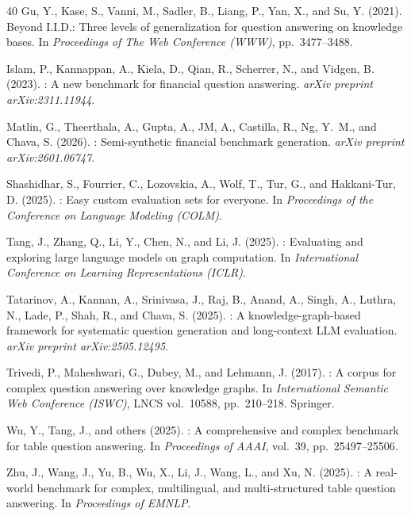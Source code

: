 \documentclass[11pt]{article}
\begin{document}
\begin{thebibliography}{40}
Gu, Y., Kase, S., Vanni, M., Sadler, B., Liang, P., Yan, X., and
  Su, Y. (2021).
\newblock Beyond {I.I.D.}: Three levels of generalization for question
  answering on knowledge bases.
\newblock In \emph{Proceedings of The Web Conference (WWW)}, pp.~3477--3488.

Islam, P., Kannappan, A., Kiela, D., Qian, R., Scherrer, N., and
  Vidgen, B. (2023).
: A new benchmark for financial question answering.
\newblock \emph{arXiv preprint arXiv:2311.11944}.

Matlin, G., Theerthala, A., Gupta, A., JM, A., Castilla, R., Ng, Y.~M.,
  and Chava, S. (2026).
: Semi-synthetic financial benchmark generation.
\newblock \emph{arXiv preprint arXiv:2601.06747}.

Shashidhar, S., Fourrier, C., Lozovskia, A., Wolf, T., Tur, G., and
  Hakkani-Tur, D. (2025).
: Easy custom evaluation sets for everyone.
\newblock In \emph{Proceedings of the Conference on Language Modeling (COLM)}.

Tang, J., Zhang, Q., Li, Y., Chen, N., and Li, J. (2025).
: Evaluating and exploring large language models on graph
  computation.
\newblock In \emph{International Conference on Learning Representations (ICLR)}.

Tatarinov, A., Kannan, A., Srinivasa, J., Raj, B., Anand, A., Singh, A.,
  Luthra, N., Lade, P., Shah, R., and Chava, S. (2025).
: A knowledge-graph-based framework for systematic question
  generation and long-context {LLM} evaluation.
\newblock \emph{arXiv preprint arXiv:2505.12495}.

Trivedi, P., Maheshwari, G., Dubey, M., and Lehmann, J. (2017).
: A corpus for complex question answering over knowledge
  graphs.
\newblock In \emph{International Semantic Web Conference (ISWC)},
  LNCS vol.~10588, pp.~210--218. Springer.

Wu, Y., Tang, J., and others (2025).
: A comprehensive and complex benchmark for table
  question answering.
\newblock In \emph{Proceedings of AAAI}, vol.~39, pp.~25497--25506.

Zhu, J., Wang, J., Yu, B., Wu, X., Li, J., Wang, L., and Xu, N. (2025).
: A real-world benchmark for complex, multilingual, and
  multi-structured table question answering.
\newblock In \emph{Proceedings of EMNLP}.

\end{thebibliography}
\end{document}
